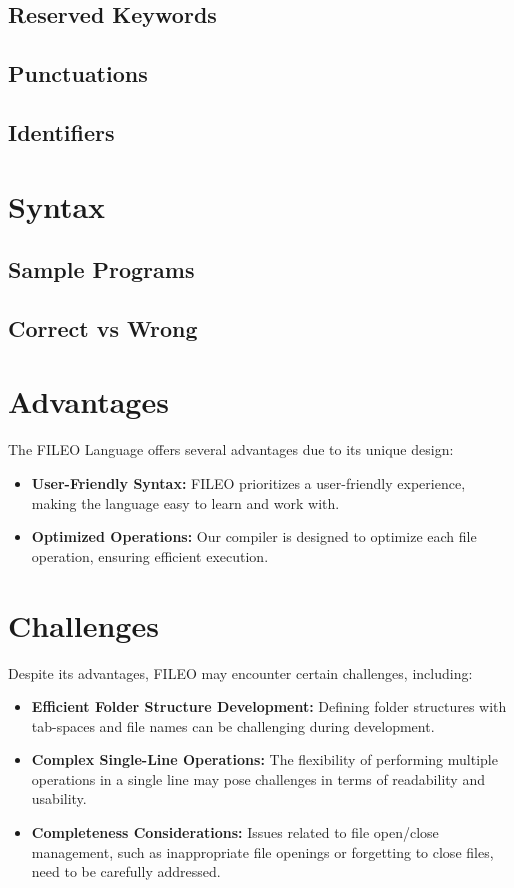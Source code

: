 \documentclass{article}
\begin{document}
\subsection{Reserved Keywords}
\subsection{Punctuations}
\subsection{Identifiers}

\section{Syntax}
\subsection{Sample Programs}
\subsection{Correct vs Wrong}

\section{Advantages}
The FILEO Language offers several advantages due to its unique design:

\begin{itemize}
    \item \textbf{User-Friendly Syntax:} FILEO prioritizes a user-friendly experience, making the language easy to learn and work with.

    \item \textbf{Optimized Operations:} Our compiler is designed to optimize each file operation, ensuring efficient execution.

\end{itemize}

\section{Challenges}
Despite its advantages, FILEO may encounter certain challenges, including:

\begin{itemize}
    \item \textbf{Efficient Folder Structure Development:} Defining folder structures with tab-spaces and file names can be challenging during development.

    \item \textbf{Complex Single-Line Operations:} The flexibility of performing multiple operations in a single line may pose challenges in terms of readability and usability.

    \item \textbf{Completeness Considerations:} Issues related to file open/close management, such as inappropriate file openings or forgetting to close files, need to be carefully addressed.

\end{itemize}
\end{document}
